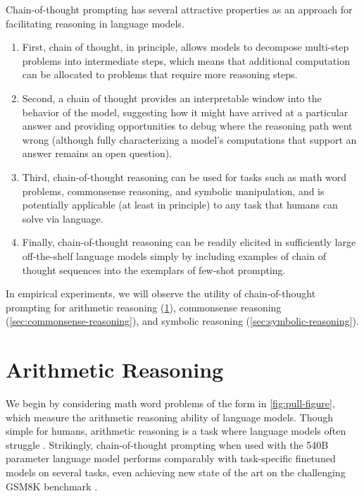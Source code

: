 \documentclass[]{article}
\theoremstyle{plain}
\theoremstyle{definition}
\theoremstyle{remark}
\begin{document}
Chain-of-thought prompting has several attractive properties as an approach for facilitating reasoning in language models.
\begin{enumerate}[topsep=1pt,itemsep=0ex]%
    \item First, chain of thought, in principle, allows models to decompose multi-step problems into intermediate steps, which means that additional computation can be allocated to problems that require more reasoning steps.
    \item Second, a chain of thought provides an interpretable window into the behavior of the model, suggesting how it might have arrived at a particular answer and providing opportunities to debug where the reasoning path went wrong (although fully characterizing a model's computations that support an answer remains an open question).
    \item Third, chain-of-thought reasoning can be used for tasks such as math word problems, commonsense reasoning, and symbolic manipulation, and is potentially applicable (at least in principle) to any task that humans can solve via language.
    \item Finally, chain-of-thought reasoning can be readily elicited in sufficiently large off-the-shelf language models simply by including examples of chain of thought sequences into the exemplars of few-shot prompting.
\end{enumerate}

In empirical experiments, we will observe the utility of chain-of-thought prompting for arithmetic reasoning (\cref{sec:arithmetic-reasoning}), commonsense reasoning (\cref{sec:commonsense-reasoning}), and symbolic reasoning (\cref{sec:symbolic-reasoning}).


\section{Arithmetic Reasoning}\label{sec:arithmetic-reasoning}
We begin by considering math word problems of the form in \cref{fig:pull-figure}, which measure the arithmetic reasoning ability of language models.
Though simple for humans, arithmetic reasoning is a task where language models often struggle \citep[][\textit{inter alia}]{hendrycks2021measuring,patel-etal-2021-nlp}.
Strikingly, chain-of-thought prompting when used with the 540B parameter language model performs comparably with task-specific finetuned models on several tasks, even achieving new state of the art on the challenging GSM8K benchmark \citep{cobbe2021training}.
\end{document}
